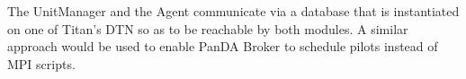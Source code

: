 The UnitManager and the Agent communicate via a database that is instantiated on
one of Titan's DTN so as to be reachable by both modules. A similar approach would
be used to enable PanDA Broker to schedule pilots instead of MPI
scripts.


%



